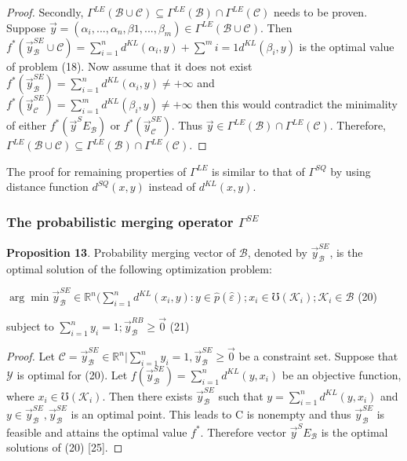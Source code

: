 \documentclass[]{iosart2c}
\begin{document}
\begin{proof}
        Secondly, $\Gamma^{LE}(\mathcal{B} \cup \mathcal{C}) \subseteq \Gamma^{LE}(\mathcal{B}) \cap \Gamma^{LE}(\mathcal{C})$ needs
        to be proven. Suppose $\vec{y} = (\alpha_i, ... , \alpha_n, \beta1, ... , \beta_m)
        \in \Gamma^{LE}(\mathcal{B} \cup \mathcal{C})$.
        Then $f^*(\vec{y}^{SE}_\mathcal{B} \cup\mathcal{C}) = \sum^n_{i=1} d^{KL}(\alpha_i, y) + \sum^m{i=1} d^{KL}(\beta_i, y)$ is the optimal value of problem (18).
        Now assume that it does not exist $f^*(\vec{y}^{SE}_\mathcal{B} ) = \sum^n_{i=1} d^{KL}(\alpha_i, y) \neq +\infty$ and $f^*(\vec{y}^{SE}_\mathcal{C} ) = \sum^m_{i=1}
        d^{KL}(\beta_i, y) \neq +\infty$ then this would contradict
        the minimality of either $f^*(\vec{y}^SE_\mathcal{B})$ or
        $f^*(\vec{y}^{SE}_\mathcal{C} )$. Thus $\vec{y} \in \Gamma^{LE}(\mathcal{B}) \cap \Gamma^{LE}(\mathcal{C})$. Therefore,
        $\Gamma^{LE}(\mathcal{B} \cup \mathcal{C}) \subseteq \Gamma^{LE}(\mathcal{B}) \cap \Gamma^{LE}(\mathcal{C})$.
    \end{proof}

    The proof for remaining properties of $\Gamma^{LE}$ is similar to that of
    $\Gamma^{SQ}$ by using distance function $d^{SQ}(x, y)$
    instead of $d^{KL}(x, y)$.

    \subsubsection{The probabilistic merging operator $\Gamma^{SE}$}

    \textbf{Proposition 13}. Probability merging vector of $\mathcal{B}$,
    denoted by $\vec{y}^{SE}_\mathcal{B}$, is the optimal solution of the following optimization problem:

    $\arg \min\vec{y}^{SE}_\mathcal{B} \in \mathbb{R}^n (
    \sum^n_{i=1} d^{KL}(x_i, y) :
    y \in \hat{p}(\hat{\varepsilon}); x_i \in \mho(\mathcal{K}_i);\mathcal{K}_i \in \mathcal{B}$ (20)

    subject to $\sum^n_{i=1} y_i = 1; \vec{y}^{RB}_\mathcal{B}\geq\vec{0}$ (21)
    \begin{proof}
        Let $\mathcal{C} = {\vec{y}^{SE}_\mathcal{B} \in \mathbb{R}^n|\sum^n_{i=1} y_i = 1, \vec{y}^{SE}_\mathcal{B}\geq\vec{0}}$
        be a constraint set. Suppose that $\mathcal{Y}$ is optimal for
        (20). Let $f(\vec{y}^{SE}_\mathcal{B})= \sum^n_{i=1} d^{KL}(y, x_i)$ be an objective function,
        where $x_i \in \mho(\mathcal{K}_i)$. Then there exists $\vec{y}^{SE}_\mathcal{B}$
        such that $y = \sum^n_{i=1} d^{KL}(y, x_i)$ and $y \in \vec{y}^{SE}_\mathcal{B} ,\vec{y}^{SE}_\mathcal{B}$ is
        an optimal point. This leads to C is nonempty and
        thus $\vec{y}^{SE}_\mathcal{B}$ is feasible and attains the optimal value $f^*$.
        Therefore vector $\vec{y}^SE_\mathcal{B}$ is the optimal solutions of (20)
        [25].
    \end{proof}
\end{document}

